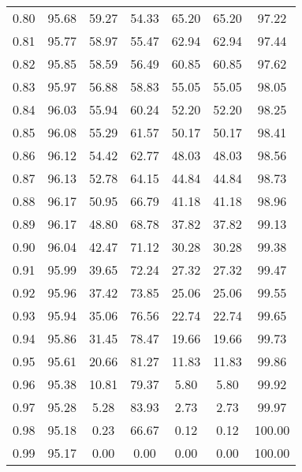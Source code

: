 \begin{tabular}{|c|c|c|c|c|c|c|}
      0.80 &     95.68 &     59.27 &      54.33 &   65.20 &      65.20 &         97.22 \\
      0.81 &     95.77 &     58.97 &      55.47 &   62.94 &      62.94 &         97.44 \\
      0.82 &     95.85 &     58.59 &      56.49 &   60.85 &      60.85 &         97.62 \\
      0.83 &     95.97 &     56.88 &      58.83 &   55.05 &      55.05 &         98.05 \\
      0.84 &     96.03 &     55.94 &      60.24 &   52.20 &      52.20 &         98.25 \\
      0.85 &     96.08 &     55.29 &      61.57 &   50.17 &      50.17 &         98.41 \\
      0.86 &     96.12 &     54.42 &      62.77 &   48.03 &      48.03 &         98.56 \\
      0.87 &     96.13 &     52.78 &      64.15 &   44.84 &      44.84 &         98.73 \\
      0.88 &     96.17 &     50.95 &      66.79 &   41.18 &      41.18 &         98.96 \\
      0.89 &     96.17 &     48.80 &      68.78 &   37.82 &      37.82 &         99.13 \\
      0.90 &     96.04 &     42.47 &      71.12 &   30.28 &      30.28 &         99.38 \\
      0.91 &     95.99 &     39.65 &      72.24 &   27.32 &      27.32 &         99.47 \\
      0.92 &     95.96 &     37.42 &      73.85 &   25.06 &      25.06 &         99.55 \\
      0.93 &     95.94 &     35.06 &      76.56 &   22.74 &      22.74 &         99.65 \\
      0.94 &     95.86 &     31.45 &      78.47 &   19.66 &      19.66 &         99.73 \\
      0.95 &     95.61 &     20.66 &      81.27 &   11.83 &      11.83 &         99.86 \\
      0.96 &     95.38 &     10.81 &      79.37 &    5.80 &       5.80 &         99.92 \\
      0.97 &     95.28 &      5.28 &      83.93 &    2.73 &       2.73 &         99.97 \\
      0.98 &     95.18 &      0.23 &      66.67 &    0.12 &       0.12 &        100.00 \\
      0.99 &     95.17 &      0.00 &       0.00 &    0.00 &       0.00 &        100.00 \\
\bottomrule
\end{tabular}
